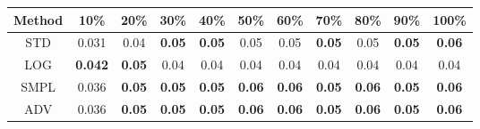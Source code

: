 \documentclass{standalone}
\begin{document}
\begin{tabular}{c|cccccccccc}
      \toprule
      Method & 10\% & 20\% & 30\% & 40\% & 50\% & 60\% & 70\% & 80\% & 90\% & 100\% \\
      \midrule
STD & 0.031 & 0.04 & \textbf{0.05} & \textbf{0.05} & 0.05 & 0.05 & \textbf{0.05} & 0.05 & \textbf{0.05} & \textbf{0.06}\\
LOG & \textbf{0.042} & \textbf{0.05} & 0.04 & 0.04 & 0.04 & 0.04 & 0.04 & 0.04 & 0.04 & 0.04\\
SMPL & 0.036 & \textbf{0.05} & \textbf{0.05} & \textbf{0.05} & \textbf{0.06} & \textbf{0.06} & \textbf{0.05} & \textbf{0.06} & \textbf{0.05} & \textbf{0.06}\\
ADV & 0.036 & \textbf{0.05} & \textbf{0.05} & \textbf{0.05} & \textbf{0.06} & \textbf{0.06} & \textbf{0.05} & \textbf{0.06} & \textbf{0.05} & \textbf{0.06}\\
  \bottomrule
\end{tabular}
\end{document}
